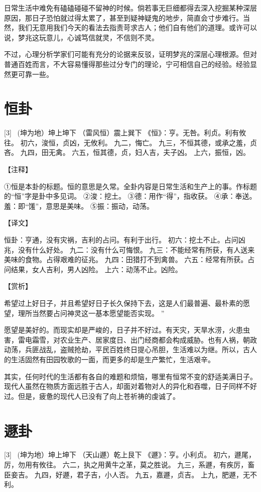 \documentclass[12pt,UTF8]{ctexbook}
\begin{document}
日常生活中难免有磕磕碰碰不留神的时候。倘若事无巨细都得去深入挖掘某种深层原因，那日子恐怕就过得太累了，甚至到疑神疑鬼的地步，简直会寸步难行。当然，我们无意用我们今天的看法去指责苛求古人；他们自有他们的道理。或许可以说，梦兆这玩意儿，心诚笃信就灵，不信则不灵。

不过，心理分析学家们可能有充分的论据来反驳，证明梦兆的深层心理根源。但对普通百姓而言，不大容易懂得那些过分专门的理论，宁可相信自己的经验。经验显然更可靠一些。

\chapter{恒卦}
[3] \ (坤为地）坤上坤下
（雷风恒）震上巽下
《恒》：亨。无咎。利贞。利有攸往。
初六，浚恒，贞凶，无攸利。
九二，悔亡。
九三，不恒其德，或承之羞，贞吝。
九四，田无禽。
六五，恒其德，贞，妇人吉，夫子凶。
上六，振恒，凶。

【注释】

①恒是本卦的标题。恒的意思是久常。全卦内容是日常生活和生产上的事。作标题的“恒”字是卦中多见词。
②浚：挖土。
③德：用作“得”，指收获。
④承：奉送。羞：即“馐”，意思是美味。
⑤振：振动，动荡。

【译文】

恒卦：亨通，没有灾祸，吉利的占问。有利于出行。
初六：挖土不止。占问凶兆，没有什么好处。
九二：没有什么可悔恨。
九三：不能经常有所获，有人送来美味的食物。占得艰难的征兆。
九四：田猎打不到禽兽。
六五：经常有所获。占问结果，女人吉利，男人凶险。
上六：动荡不止。凶险。

【赏析】

希望过上好日子，并且希望好日子长久保持下去，这是人们最普遍、最朴素的愿望，理所当然要占问神灵这一基本愿望能否实现。 ”

愿望是美好的。而现实却是严峻的，日子并不好过。有天灾，天旱水涝，火患虫害，雷电霜雪，对农业生产、居家度日、出门经商都会构成威胁。也有人祸，朝政动荡，兵匪战乱，盗贼抢劫，平民百姓终日提心吊胆，生活难以为继。所以，古人的生活固然有田园牧歌的一面，而更多的却是生产繁忙，生活艰辛。

其实，任何时代的生活都有各自的难题和烦恼，哪里有恒常不变的舒适美满日子。现代人虽然在物质方面远胜于古人，却面对着物对人的异化和吞噬，日子同样不好过。但是，疲惫的现代人已没有了向上苍祈祷的虔诚了。

\chapter{遯卦}
[3] \ (坤为地）坤上坤下
（天山遯）乾上艮下
《遯》：亨。小利贞。
初六，遯尾，厉，勿用有攸往。
六二，执之用黄牛之革，莫之胜说。
九三，系遯，有疾厉，畜臣妾吉。
九四，好遯，君子吉，小人否。
九五，嘉遯，贞吉。
上九，肥遯，无不利。
\end{document}
